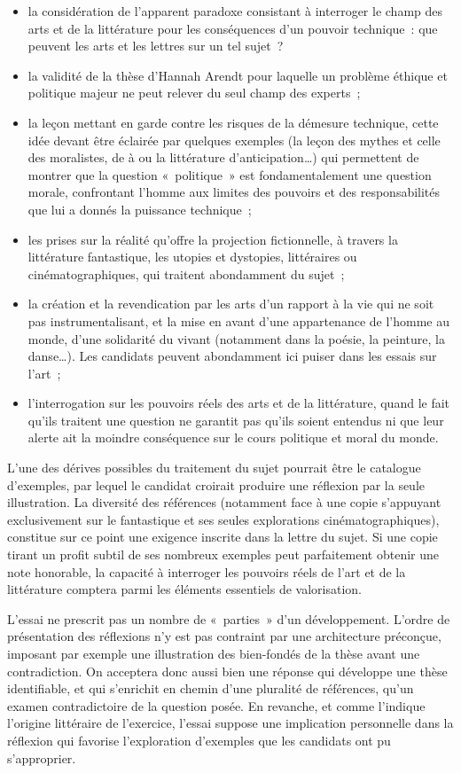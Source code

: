 {\begin{itemize}
\item la considération de l'apparent paradoxe consistant à interroger le champ des arts
et de la littérature pour les conséquences d'un pouvoir technique~: que peuvent les
arts et les lettres sur un tel sujet~?
\item la validité de la thèse d'Hannah Arendt pour laquelle un problème éthique et
politique majeur ne peut relever du seul champ des experts~;
\item la leçon mettant en garde contre les risques de la démesure technique, cette
idée devant être éclairée par quelques exemples (la leçon des mythes et celle des
moralistes, de  à  ou la littérature d'anticipation…) qui permettent
de montrer que la question «~politique~» est fondamentalement une question
morale, confrontant l'homme aux limites des pouvoirs et des responsabilités que
lui a donnés la puissance technique~;
\item les prises sur la réalité qu'offre la projection fictionnelle, à travers la littérature
fantastique, les utopies et dystopies, littéraires ou cinématographiques, qui traitent
abondamment du sujet~;
\item la création et la revendication par les arts d'un rapport à la vie qui ne soit pas
instrumentalisant, et la mise en avant d'une appartenance de l'homme au monde,
d'une solidarité du vivant (notamment dans la poésie, la peinture, la danse…). Les
candidats peuvent abondamment ici puiser dans les essais sur l'art~;
\item l'interrogation sur les pouvoirs réels des arts et de la littérature, quand le fait qu'ils
traitent une question ne garantit pas qu'ils soient entendus ni que leur alerte ait la
moindre conséquence sur le cours politique et moral du monde.
\end{itemize}

L'une des dérives possibles du traitement du sujet pourrait être le catalogue
d'exemples, par lequel le candidat croirait produire une réflexion par la seule
illustration. La diversité des références (notamment face à une copie s'appuyant
exclusivement sur le fantastique et ses seules explorations cinématographiques),
constitue sur ce point une exigence inscrite dans la lettre du sujet. Si une copie
tirant un profit subtil de ses nombreux exemples peut parfaitement obtenir une
note honorable, la capacité à interroger les pouvoirs réels de l'art et de la littérature
comptera parmi les éléments essentiels de valorisation.

L'essai ne prescrit pas un nombre de «~parties~» d'un développement. L'ordre de
présentation des réflexions n'y est pas contraint par une architecture préconçue,
imposant par exemple une illustration des bien-fondés de la thèse avant une
contradiction. On acceptera donc aussi bien une réponse qui développe une thèse
identifiable, et qui s'enrichit en chemin d'une pluralité de références, qu'un examen
contradictoire de la question posée. En revanche, et comme l'indique l'origine littéraire
de l'exercice, l'essai suppose une implication personnelle dans la réflexion qui favorise
l'exploration d'exemples que les candidats ont pu s'approprier.}
